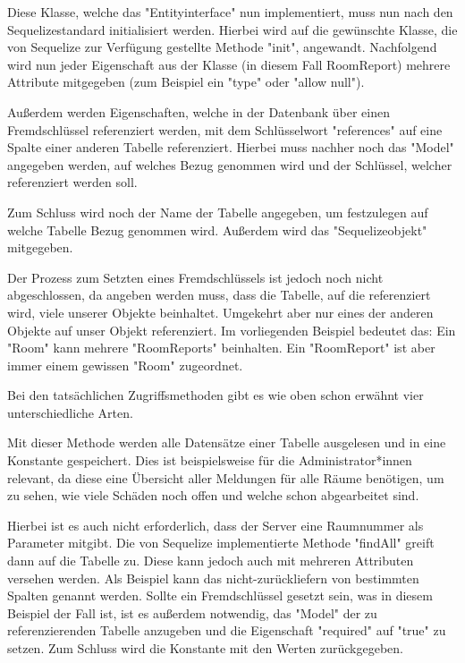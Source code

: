 Diese Klasse, welche das "Entityinterface" nun implementiert, muss nun nach den Sequelizestandard initialisiert werden. Hierbei wird auf die gewünschte Klasse, die von Sequelize zur Verfügung gestellte Methode "init", angewandt. Nachfolgend wird nun jeder Eigenschaft aus der Klasse (in diesem Fall RoomReport) mehrere Attribute mitgegeben (zum Beispiel ein "type" oder "allow null").

Außerdem werden Eigenschaften, welche in der Datenbank über einen Fremdschlüssel referenziert werden, mit dem Schlüsselwort "references" auf eine Spalte einer anderen Tabelle referenziert. Hierbei muss nachher noch das "Model" angegeben werden,
auf welches Bezug genommen wird und der Schlüssel, welcher referenziert werden soll.

Zum Schluss wird noch der Name der Tabelle angegeben, um festzulegen auf welche Tabelle Bezug genommen wird. Außerdem wird das "Sequelizeobjekt" mitgegeben.


Der Prozess zum Setzten eines Fremdschlüssels ist jedoch noch nicht abgeschlossen, da angeben werden muss, dass die Tabelle, auf die referenziert wird, viele unserer Objekte beinhaltet. Umgekehrt aber nur eines der anderen Objekte auf unser Objekt referenziert. Im vorliegenden Beispiel bedeutet das: Ein "Room" kann mehrere "RoomReports" beinhalten. Ein "RoomReport" ist aber immer einem gewissen "Room" zugeordnet.


Bei den tatsächlichen Zugriffsmethoden gibt es wie oben schon erwähnt vier unterschiedliche Arten.


Mit dieser Methode werden alle Datensätze einer Tabelle ausgelesen und in eine Konstante gespeichert. Dies ist beispielsweise für die Administrator*innen relevant, da diese eine Übersicht aller Meldungen für alle Räume benötigen, um zu sehen, wie viele Schäden noch offen und welche schon abgearbeitet sind.

Hierbei ist es auch nicht erforderlich, dass der Server eine Raumnummer als Parameter mitgibt. Die von Sequelize implementierte Methode "findAll" greift dann auf die Tabelle zu. Diese kann jedoch auch mit mehreren Attributen versehen werden. Als Beispiel kann das nicht-zurückliefern von bestimmten Spalten genannt werden. Sollte ein Fremdschlüssel gesetzt sein, was in diesem Beispiel der Fall ist, ist es außerdem notwendig, das "Model" der zu referenzierenden Tabelle anzugeben und die Eigenschaft "required" auf "true" zu setzen. Zum Schluss wird die Konstante mit den Werten zurückgegeben.


